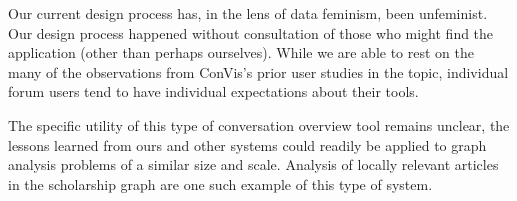 \documentclass{egpubl}
\begin{document}
Our current design process has, in the lens of data feminism, been unfeminist. Our design process happened without consultation of those who might find the application (other than perhaps ourselves). While we are able to rest on the many of the observations from ConVis's prior user studies in the topic, individual forum users tend to have individual expectations about their tools.

The specific utility of this type of conversation overview tool remains unclear, the lessons learned from ours and other systems could readily be applied to graph analysis problems of a similar size and scale. Analysis of locally relevant articles in the scholarship graph are one such example of this type of system.





%



\end{document}
